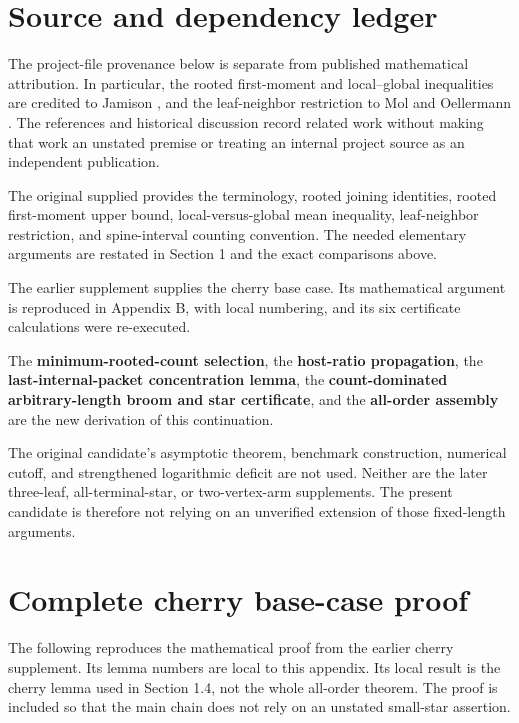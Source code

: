 \documentclass[11pt,letterpaper]{article}
\theoremstyle{plain}
\begin{document}
\appendix
\section{Source and dependency ledger}\label{appendix-a.-source-and-dependency-ledger}
The project-file provenance below is separate from published mathematical attribution. In particular, the rooted first-moment and local--global inequalities are credited to Jamison \cite{Jamison1983}, and the leaf-neighbor restriction to Mol and Oellermann \cite{MolOellermann2019}. The references and historical discussion record related work without making that work an unstated premise or treating an internal project source as an independent publication.


The original supplied  provides the terminology, rooted joining identities, rooted first-moment upper bound, local-versus-global mean inequality, leaf-neighbor restriction, and spine-interval counting convention. The needed elementary arguments are restated in Section 1 and the exact comparisons above.

The earlier supplement  supplies the cherry base case. Its mathematical argument is reproduced in Appendix B, with local numbering, and its six certificate calculations were re-executed.

The \textbf{minimum-rooted-count selection}, the \textbf{host-ratio propagation}, the \textbf{last-internal-packet concentration lemma}, the \textbf{count-dominated arbitrary-length broom and star certificate}, and the \textbf{all-order assembly} are the new derivation of this continuation.

The original candidate's asymptotic theorem, benchmark construction, numerical cutoff, and strengthened logarithmic deficit are not used. Neither are the later three-leaf, all-terminal-star, or two-vertex-arm supplements. The present candidate is therefore not relying on an unverified extension of those fixed-length arguments.

\section{Complete cherry base-case proof}\label{appendix-b.-complete-cherry-base-case-proof}

The following reproduces the mathematical proof from the earlier cherry supplement. Its lemma numbers are local to this appendix. Its local result is the cherry lemma used in Section 1.4, not the whole all-order theorem. The proof is included so that the main chain does not rely on an unstated small-star assertion.
\end{document}

